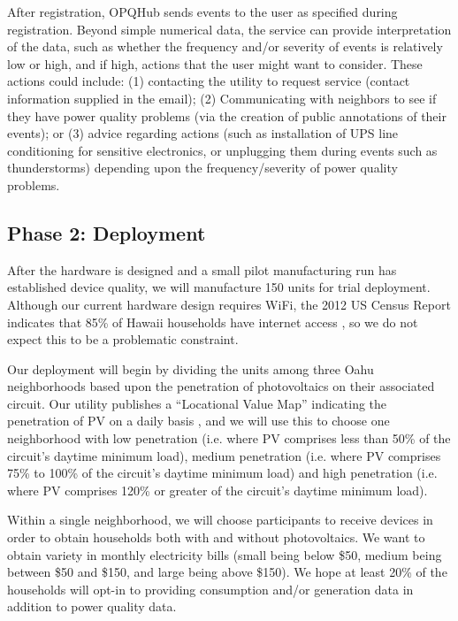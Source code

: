 After registration, OPQHub sends events to the user as specified during registration.  Beyond simple numerical data, the service can provide interpretation of the data, such as whether the frequency and/or severity of events is relatively low or high, and if high, actions that the user might want to consider.  These actions could include: (1) contacting the utility to request service (contact information supplied in the email); (2) Communicating with neighbors to see if they have power quality problems (via the creation of public annotations of their events); or (3) advice regarding actions (such as installation of UPS line conditioning for sensitive electronics, or unplugging them during events such as thunderstorms) depending upon the frequency/severity of power quality problems.

\subsection{Phase 2: Deployment}

After the hardware is designed and a small pilot manufacturing run has established device quality, we will manufacture 150 units for trial deployment.  Although our current hardware design requires WiFi, the 2012 US Census Report indicates that 85\% of Hawaii households have internet access \cite{home-internet-access}, so we do not expect this to be a problematic constraint. 

Our deployment will begin by dividing the units among three Oahu neighborhoods based upon the penetration of photovoltaics on their associated circuit.  Our utility publishes a ``Locational Value Map'' indicating the penetration of PV on a daily basis \cite{lvm}, and we will use this to choose one neighborhood with low penetration (i.e. where PV comprises less than 50\% of the circuit's daytime minimum load), medium penetration (i.e. where PV comprises 75\% to 100\% of the circuit's daytime minimum load) and high penetration (i.e. where PV comprises 120\% or greater of the circuit's daytime minimum load). 

Within a single neighborhood, we will choose participants to receive devices in order to obtain households both with and without photovoltaics. We want to obtain variety in monthly electricity bills (small being below \$50, medium being between \$50 and \$150, and large being above \$150).  We hope at least 20\% of the households will opt-in to providing consumption and/or generation data in addition to power quality data. 


